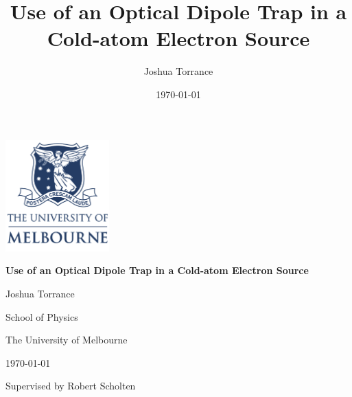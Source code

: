 \documentclass[12pt]{report}
\title{Use of an Optical Dipole Trap in a Cold-atom Electron Source}
\author{Joshua Torrance}
\date{\today}
\begin{document}

\renewcommand{\footnotesize}{\small}
\renewcommand{\footnoterule}{\relax}
\thispagestyle{empty}
\begin{center}
    {{{\includegraphics[width=4cm]{figs/unimelb.png}} \par}
 \Huge {\bfseries {Use of an Optical Dipole Trap in a Cold-atom Electron Source}} \par}
{\large \vspace*{35mm} \vspace*{15mm}}
    {{\vspace*{25mm} \Large {Joshua Torrance}} \par} 
{\large 
    \vspace*{1ex}
    {{School of Physics} \par}
    \vspace*{1ex}
    {{The University of Melbourne} \par}
    \vspace*{25mm}
    {\today\par}
    {Supervised by Robert Scholten\par}
}%
\end{center}
\null\vfill




\tableofcontents


\renewcommand{\chaptername}{} %


\glsresetall

\glsresetall
%

\glsresetall

\glsresetall

\glsresetall


\twocolumn
\printglossaries
\onecolumn


\end{document}
